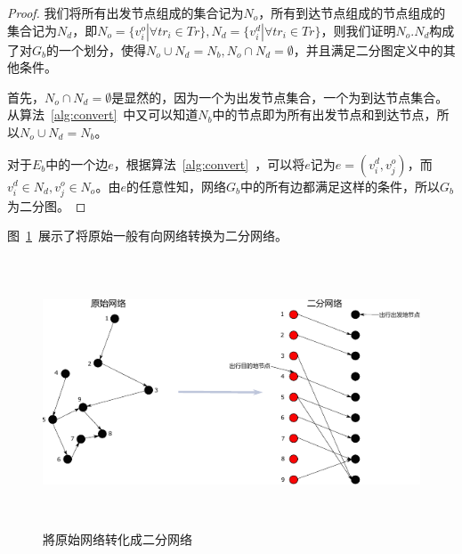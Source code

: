 \begin{proof}
我们将所有出发节点组成的集合记为$N_o$，所有到达节点组成的节点组成的集合记为$N_d$，即$N_o = \{v_i^o| \forall tr_i \in Tr\},N_d = \{v_i^d| \forall tr_i \in Tr\}$，则我们证明$N_o. N_d$构成了对$G_b$的一个划分，使得$N_o\cup N_d = N_b, N_o\cap N_d = \emptyset$，并且满足二分图定义中的其他条件。
\par
首先，$N_o\cap N_d = \emptyset$是显然的，因为一个为出发节点集合，一个为到达节点集合。从算法~\ref{alg:convert}~中又可以知道$N_b$中的节点即为所有出发节点和到达节点，所以$N_o\cup N_d = N_b$。
\par
对于$E_b$中的一个边$e$，根据算法~\ref{alg:convert}~，可以将$e$记为$e = (v_i^d, v_j^o)$，而$v_i^d \in N_d, v_j^o \in N_o$。由$e$的任意性知，网络$G_b$中的所有边都满足这样的条件，所以$G_b$为二分图。
\end{proof}
\par
图~\ref{fig:bipar}~展示了将原始一般有向网络转换为二分网络。
\begin{figure}
\centering
\includegraphics[height=8cm]{./figures/img/bipartiteNetwork.pdf}
\caption{將原始网络转化成二分网络}
\label{fig:bipar}
\end{figure}

